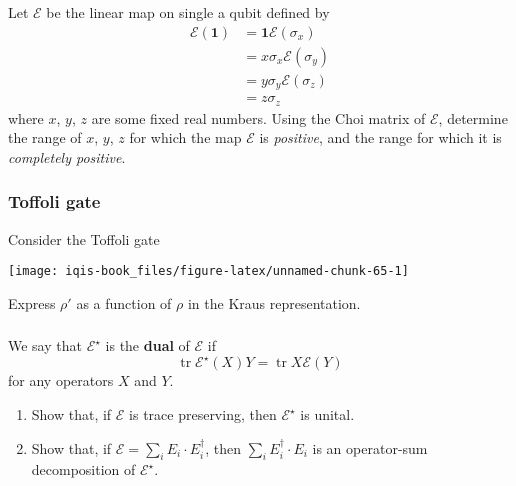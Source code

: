 \documentclass[fleqn]{article}
\providecommand{\tightlist}{%
  \setlength{\itemsep}{0pt}\setlength{\parskip}{0pt}}
\begin{document}
Let \(\mathcal{E}\) be the linear map on single a qubit defined by
\[
  \begin{aligned}
    \mathcal{E}(\mathbf{1})
    &= \mathbf{1}
    \mathcal{E}(\sigma_x)
  \\&= x\sigma_x
    \mathcal{E}(\sigma_y)
  \\&= y\sigma_y
    \mathcal{E}(\sigma_z)
  \\&= z\sigma_z
  \end{aligned}
\]
where \(x\), \(y\), \(z\) are some fixed real numbers.
Using the Choi matrix of \(\mathcal{E}\), determine the range of \(x\), \(y\), \(z\) for which the map \(\mathcal{E}\) is \emph{positive}, and the range for which it is \emph{completely positive}.

\hypertarget{toffoli-gate}{%
\subsubsection{Toffoli gate}\label{toffoli-gate}}

Consider the Toffoli gate

\begin{center}\texttt{[image: iqis-book\_files/figure-latex/unnamed-chunk-65-1]} \end{center}

Express \(\rho'\) as a function of \(\rho\) in the Kraus representation.

\hypertarget{section-39}{%
\subsubsection{}\label{section-39}}

We say that \(\mathcal{E}^\star\) is the \textbf{dual} of \(\mathcal{E}\) if
\[
  \operatorname{tr}\mathcal{E}^\star (X)Y = \operatorname{tr}X\mathcal{E}(Y)
\]
for any operators \(X\) and \(Y\).

\begin{enumerate}
\def\labelenumi{\arabic{enumi}.}
\tightlist
\item
  Show that, if \(\mathcal{E}\) is trace preserving, then \(\mathcal{E}^\star\) is unital.
\item
  Show that, if \(\mathcal{E}=\sum_i E_i\cdot E_i^\dagger\), then \(\sum_i E^\dagger_i\cdot E_i\) is an operator-sum decomposition of \(\mathcal{E}^\star\).
\end{enumerate}

\hypertarget{section-40}{%
\subsubsection{}\label{section-40}}
\end{document}
